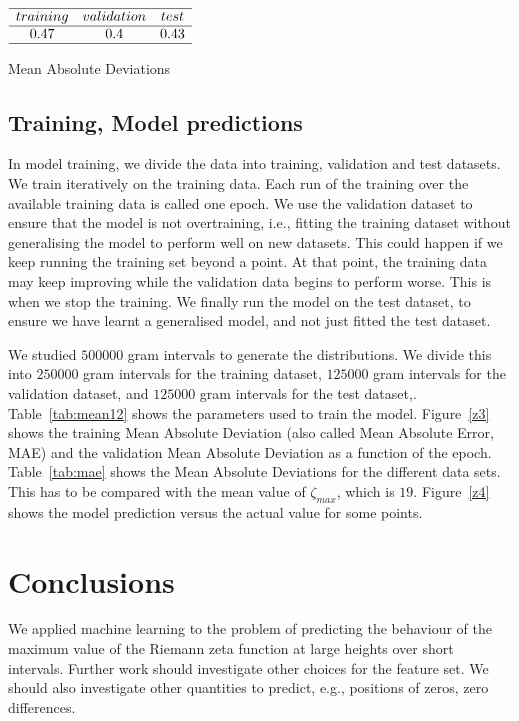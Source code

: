 \documentclass[twoside]{article}
\begin{document}
\begin{table}
\centering \(\begin{array}{cccccccccccc}

\hline
training     &validation  &test \\
\hline
0.47 &0.4  & 0.43  \\
\hline
\end{array}\)
\caption{Mean Absolute Deviations}
\label{tab:mae}
\end{table}

\subsection{\label{relation}Training,  Model predictions}

In model training, we divide the data into training, validation and test datasets.
We train iteratively on the training data.
Each run of the training over the available training data is called one epoch.
We use the validation dataset to ensure
that the model is not overtraining, i.e., fitting the training dataset without generalising the model
to perform well on new datasets.  
This could happen if we keep running
the training set beyond a point. At that point, the training data may keep
improving while the validation data begins to perform worse.   This is when we stop the training.
We finally run the model on the test dataset, to ensure we have learnt a generalised model, and not
just fitted the test dataset.

We studied $500000$ gram intervals  to generate the distributions.
We divide this into $250000$ gram intervals for the training dataset, 
$125000$ gram intervals for the validation dataset, 
and $125000$ gram intervals for the test dataset,.
Table~\ref{tab:mean12} shows the parameters used to train the model. 
Figure~\ref{z3} shows the training Mean Absolute Deviation (also called Mean Absolute Error, MAE) 
and the validation Mean Absolute Deviation as a function of the epoch.
Table~\ref{tab:mae} shows the Mean Absolute Deviations for the different data sets.  This has
to be compared with the mean value of $\zeta_{max}$, which is $19$.  Figure~\ref{z4}
shows the model prediction versus the actual value for some points.

\section{\label{conclusions}Conclusions}
We applied
machine learning to the problem of predicting the behaviour of the maximum value
of the Riemann zeta function at large heights over short intervals.
Further work should investigate other choices for the feature set. 
We should also investigate other quantities to predict, e.g., positions of 
zeros, zero differences.
\end{document}
